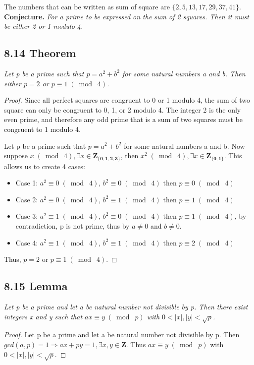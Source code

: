 \documentclass{article}
\begin{document}
The numbers that can be written as sum of square are $\{2,5,13,17,29,37,41\}$. \\
\textbf{Conjecture.} \textit{For a prime to be expressed on the sum of 2 squares. Then it must be either 2 or 1 modulo 4.}

\subsection*{8.14 Theorem} 
\quad \textit{Let p be a prime such that $p = a^2 + b^2$ for some natural numbers a and b. Then either $p = 2$ or $p \equiv 1 \;(\bmod\; 4)$.}

\begin{proof}
Since all perfect squares are congruent to 0 or 1 modulo 4, the sum of two square can only be congruent to 0, 1, or 2 modulo 4. The integer 2 is the only even prime, and therefore any odd prime that is a sum of two squares must be congruent to 1 modulo 4.

Let p be a prime such that $p = a^2 + b^2$ for some natural numbers a and b. Now suppose $x \;(\bmod\; 4), \exists x \in \mathbf{Z_{\{0,1,2,3\}}}$, then $x^2 \;(\bmod\; 4), \exists x \in \mathbf{Z_{\{0,1\}}}$. This allows us to create 4 cases:
\begin{itemize}
    \item Case 1: $a^2 \equiv 0 \;(\bmod\; 4)$, $b^2 \equiv 0 \;(\bmod\; 4)$ then $p \equiv 0 \;(\bmod\; 4)$
    \item Case 2: $a^2 \equiv 0 \;(\bmod\; 4)$, $b^2 \equiv 1 \;(\bmod\; 4)$ then $p \equiv 1 \;(\bmod\; 4)$
    \item Case 3: $a^2 \equiv 1 \;(\bmod\; 4)$, $b^2 \equiv 0 \;(\bmod\; 4)$ then $p \equiv 1 \;(\bmod\; 4)$, by contradiction, p is not prime, thus by $a \neq 0$ and $b \neq 0$.
    \item Case 4: $a^2 \equiv 1 \;(\bmod\; 4)$, $b^2 \equiv 1 \;(\bmod\; 4)$ then $p \equiv 2 \;(\bmod\; 4)$
\end{itemize}
Thus, $p = 2$ or $p \equiv 1 \;(\bmod\; 4)$.
\end{proof}

\subsection*{8.15 Lemma} 
\quad \textit{Let p be a prime and let a be natural number not divisible by p. Then there exist integers x and y such that $ax \equiv y \;(\bmod\; p)$ with $0 < |x|,|y| < \sqrt{p}$.}

\begin{proof}
Let p be a prime and let a be natural number not divisible by p. Then $gcd(a,p) = 1 \Longrightarrow ax + py = 1, \exists x, y \in \mathbf{Z}$. Thus $ax \equiv y \;(\bmod\; p)$ with $0 < |x|,|y| < \sqrt{p}$.
\end{proof}
\end{document}
